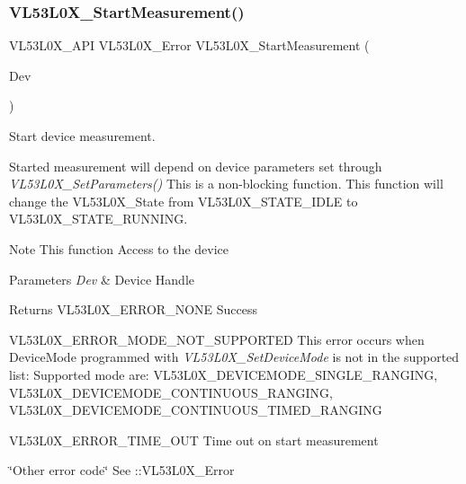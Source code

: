 \subsubsection{\texorpdfstring{V\+L53\+L0\+X\+\_\+\+Start\+Measurement()}{VL53L0X\_StartMeasurement()}}
{\footnotesize\ttfamily V\+L53\+L0\+X\+\_\+\+A\+PI V\+L53\+L0\+X\+\_\+\+Error V\+L53\+L0\+X\+\_\+\+Start\+Measurement (\begin{DoxyParamCaption}\item[{\hyperlink{group__VL53L0X__platform__group_ga2d6405308b1dd524b462f1b8fb97d167}{V\+L53\+L0\+X\+\_\+\+D\+EV}}]{Dev }\end{DoxyParamCaption})}



Start device measurement. 

Started measurement will depend on device parameters set through {\itshape V\+L53\+L0\+X\+\_\+\+Set\+Parameters()} This is a non-\/blocking function. This function will change the V\+L53\+L0\+X\+\_\+\+State from V\+L53\+L0\+X\+\_\+\+S\+T\+A\+T\+E\+\_\+\+I\+D\+LE to V\+L53\+L0\+X\+\_\+\+S\+T\+A\+T\+E\+\_\+\+R\+U\+N\+N\+I\+NG.

\begin{DoxyNote}{Note}
This function Access to the device
\end{DoxyNote}

\begin{DoxyParams}{Parameters}
{\em Dev} & Device Handle \\
\hline
\end{DoxyParams}
\begin{DoxyReturn}{Returns}
V\+L53\+L0\+X\+\_\+\+E\+R\+R\+O\+R\+\_\+\+N\+O\+NE Success 

V\+L53\+L0\+X\+\_\+\+E\+R\+R\+O\+R\+\_\+\+M\+O\+D\+E\+\_\+\+N\+O\+T\+\_\+\+S\+U\+P\+P\+O\+R\+T\+ED This error occurs when Device\+Mode programmed with {\itshape V\+L53\+L0\+X\+\_\+\+Set\+Device\+Mode} is not in the supported list\+: Supported mode are\+: V\+L53\+L0\+X\+\_\+\+D\+E\+V\+I\+C\+E\+M\+O\+D\+E\+\_\+\+S\+I\+N\+G\+L\+E\+\_\+\+R\+A\+N\+G\+I\+NG, V\+L53\+L0\+X\+\_\+\+D\+E\+V\+I\+C\+E\+M\+O\+D\+E\+\_\+\+C\+O\+N\+T\+I\+N\+U\+O\+U\+S\+\_\+\+R\+A\+N\+G\+I\+NG, V\+L53\+L0\+X\+\_\+\+D\+E\+V\+I\+C\+E\+M\+O\+D\+E\+\_\+\+C\+O\+N\+T\+I\+N\+U\+O\+U\+S\+\_\+\+T\+I\+M\+E\+D\+\_\+\+R\+A\+N\+G\+I\+NG 

V\+L53\+L0\+X\+\_\+\+E\+R\+R\+O\+R\+\_\+\+T\+I\+M\+E\+\_\+\+O\+UT Time out on start measurement 

\char`\"{}\+Other error code\char`\"{} See \+::\+V\+L53\+L0\+X\+\_\+\+Error 
\end{DoxyReturn}
\mbox{\label{group__VL53L0X__measurement__group_ga7d2e62a19cd5dc5cd9a73b819e745888}} 
